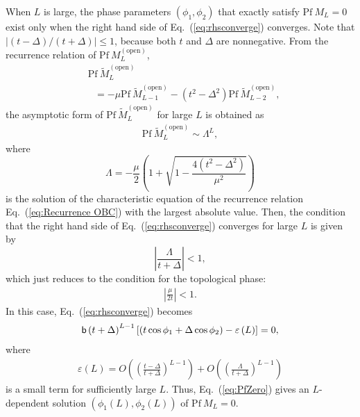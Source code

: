 \documentclass[aps, prb, showpacs, twocolumn, %
amssymb,superscriptaddress]{revtex4}
\begin{document}
\twocolumngrid

When $L$ is large, the phase parameters $\left( \phi_{1}, \phi_{2} \right)$ that exactly satisfy $\mathrm{Pf}~M_{L} = 0$ exist only when the right hand side of Eq.~(\ref{eq:rhsconverge}) converges. Note that $|(t-\Delta)/(t+\Delta)| \le 1$, because both $t$ and $\Delta$ are nonnegative. From the recurrence relation of $\mathrm{Pf}~M^{\mathrm{ \left( open \right)}}_{L}$,
\begin{align}
&\mathrm{Pf}~\tilde{M}_{L}^{\left( \mathrm{open} \right)} \nonumber \\
&~~~= -\mu \mathrm{Pf}~\tilde{M}_{L-1}^{\left( \mathrm{open} \right)} - \left( t^{2} - \Delta^{2} \right) \mathrm{Pf}~\tilde{M}_{L-2}^{\left( \mathrm{open} \right)},
	\label{eq:Recurrence OBC}
\end{align}
the asymptotic form of $\mathrm{Pf}~\tilde{M}_{L}^{\left( \mathrm{open} \right)}$ for large $L$ is obtained as
\begin{align}
\mathrm{Pf}~\tilde{M}_{L}^{\left( \mathrm{open} \right)}
\sim \Lambda^{L},
	\label{eq:Asymp OBC}
\end{align}
where 
\begin{equation}
\Lambda = -\frac{\mu}{2} \left( 1 + \sqrt{1- \frac{4 \left( t^{2} - \Delta^{2} \right)}{\mu^{2}}} \right)
\end{equation}
is the solution of the characteristic equation of the recurrence relation Eq.~(\ref{eq:Recurrence OBC}) with the largest absolute value. 
Then, the condition that the right hand side of Eq.~(\ref{eq:rhsconverge}) converges for large $L$ is given by
\begin{equation}
\left| \frac{\Lambda}{t+\Delta} \right| < 1,
	\label{ConvergeCondition}
\end{equation}
which just reduces to the condition for the topological phase:
\begin{align}
\left\lvert\frac{\mu}{2t}\right\rvert<1.
\label{eq:Topophase}
\end{align}
In this case, Eq.~(\ref{eq:rhsconverge}) becomes
\begin{align}
{\sf b} \left( t+\Delta \right)^{L-1}\left[ \left( t\cos\phi_1+\Delta\cos\phi_2 \right) - \varepsilon \left( L \right) \right] = 0,
	\label{eq:PfZero}
\end{align}
where
\begin{align}
\varepsilon(L)= O \left(\left(\frac{t-\Delta}{t+\Delta}\right)^{L-1}\right)+ O \left(\left(\frac{\Lambda}{t+\Delta}\right)^{L-1}\right)
	\label{eq:eps_L}
\end{align}
is a small term for sufficiently large $L$. Thus, Eq.~(\ref{eq:PfZero}) gives an $L$-dependent solution $\left( \phi_1 \left( L \right),\phi_2 \left( L \right) \right)$ of $\mathrm{Pf}~M_{L}=0$.
\end{document}
